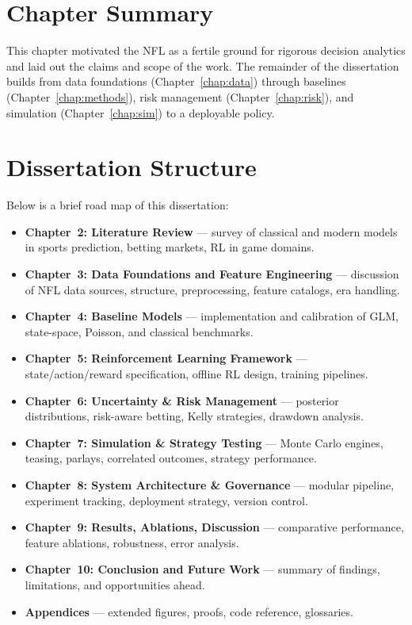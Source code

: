 \section{Chapter Summary}
This chapter motivated the NFL as a fertile ground for rigorous decision analytics and laid out the claims and scope of the work. The remainder of the dissertation builds from data foundations (Chapter~\ref{chap:data}) through baselines (Chapter~\ref{chap:methods}), risk management (Chapter~\ref{chap:risk}), and simulation (Chapter~\ref{chap:sim}) to a deployable policy.

\section{Dissertation Structure}

Below is a brief road map of this dissertation:

\begin{itemize}
  \item \textbf{Chapter~2: Literature Review} — survey of classical and modern models in sports prediction, betting markets, RL in game domains.
  \item \textbf{Chapter~3: Data Foundations and Feature Engineering} — discussion of NFL data sources, structure, preprocessing, feature catalogs, era handling.
  \item \textbf{Chapter~4: Baseline Models} — implementation and calibration of GLM, state-space, Poisson, and classical benchmarks.
  \item \textbf{Chapter~5: Reinforcement Learning Framework} — state/action/reward specification, offline RL design, training pipelines.
  \item \textbf{Chapter~6: Uncertainty \& Risk Management} — posterior distributions, risk-aware betting, Kelly strategies, drawdown analysis.
  \item \textbf{Chapter~7: Simulation \& Strategy Testing} — Monte Carlo engines, teasing, parlays, correlated outcomes, strategy performance.
  \item \textbf{Chapter~8: System Architecture \& Governance} — modular pipeline, experiment tracking, deployment strategy, version control.
  \item \textbf{Chapter~9: Results, Ablations, Discussion} — comparative performance, feature ablations, robustness, error analysis.
  \item \textbf{Chapter~10: Conclusion and Future Work} — summary of findings, limitations, and opportunities ahead.
  \item \textbf{Appendices} — extended figures, proofs, code reference, glossaries.
\end{itemize}

